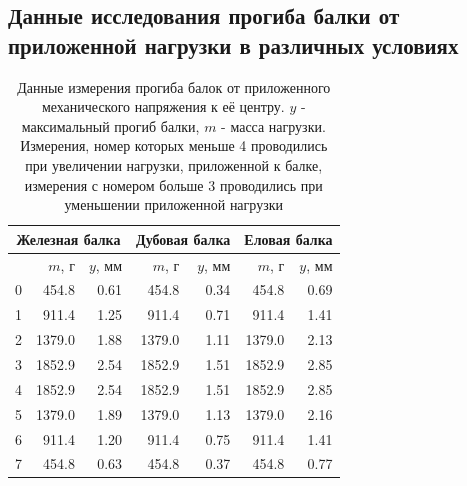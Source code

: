 \documentclass[12pt]{article}
\begin{document}
\subsection{Данные исследования прогиба балки от приложенной нагрузки в различных условиях} \label{app_2}
\begin{table}[H]
    \centering
    \begin{tabular}{|r|r|r|r|r|r|r|}
        \hline
        \multicolumn{3}{|c|}{Железная балка} & 
        \multicolumn{2}{|c|}{Дубовая балка}  & 
        \multicolumn{2}{|c|}{Еловая балка}                                                            \\
        \hline
                                             & $m$, г & $y$, мм & $m$, г & $y$, мм & $m$, г & $y$, мм \\
        \hline
        0                                    & 454.8  & 0.61    & 454.8  & 0.34    & 454.8  & 0.69    \\
        1                                    & 911.4  & 1.25    & 911.4  & 0.71    & 911.4  & 1.41    \\
        2                                    & 1379.0 & 1.88    & 1379.0 & 1.11    & 1379.0 & 2.13    \\
        3                                    & 1852.9 & 2.54    & 1852.9 & 1.51    & 1852.9 & 2.85    \\
        4                                    & 1852.9 & 2.54    & 1852.9 & 1.51    & 1852.9 & 2.85    \\
        5                                    & 1379.0 & 1.89    & 1379.0 & 1.13    & 1379.0 & 2.16    \\
        6                                    & 911.4  & 1.20    & 911.4  & 0.75    & 911.4  & 1.41    \\
        7                                    & 454.8  & 0.63    & 454.8  & 0.37    & 454.8  & 0.77    \\
        \hline
    \end{tabular}
    
    \caption{Данные измерения прогиба балок от приложенного механического напряжения к её центру. $y$ - максимальный прогиб балки,
        $m$ - масса нагрузки. Измерения, номер которых меньше 4 проводились при увеличении нагрузки, приложенной к балке, измерения с номером больше 3 проводились при уменьшении приложенной нагрузки}
    \label{tab:2}
\end{table}
\end{document}
